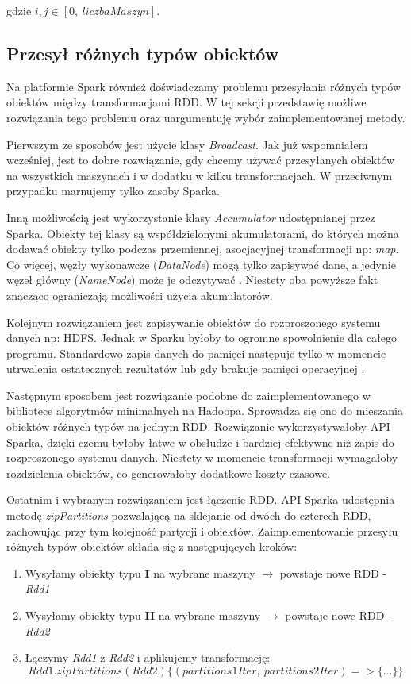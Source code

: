 \documentclass{pracamgr}
\begin{document}
gdzie \(i, j \in [0, \ liczbaMaszyn]\).

\subsection{Przesył różnych typów obiektów}

Na platformie Spark również doświadczamy problemu przesyłania różnych typów obiektów między transformacjami RDD. W tej sekcji przedstawię możliwe rozwiązania tego problemu oraz uargumentuję wybór zaimplementowanej metody.

Pierwszym ze sposobów jest użycie klasy \textit{Broadcast}. Jak już wspomniałem wcześniej, jest to dobre rozwiązanie, gdy chcemy używać przesyłanych obiektów na wszystkich maszynach i w dodatku w kilku transformacjach. W przeciwnym przypadku marnujemy tylko zasoby Sparka.

Inną możliwością jest wykorzystanie klasy \textit{Accumulator} udostępnianej przez Sparka. Obiekty tej klasy są współdzielonymi akumulatorami, do których można dodawać obiekty tylko podczas przemiennej, asocjacyjnej transformacji np: \textit{map}. Co więcej, węzły wykonawcze (\textit{DataNode}) mogą tylko zapisywać dane, a jedynie węzeł główny (\textit{NameNode}) może je odczytywać \cite{spark_documentation}. Niestety oba powyższe fakt znacząco ograniczają możliwości użycia akumulatorów.

Kolejnym rozwiązaniem jest zapisywanie obiektów do rozproszonego systemu danych np: HDFS. Jednak w Sparku byłoby to ogromne spowolnienie dla całego programu. Standardowo zapis danych do pamięci następuje tylko w momencie utrwalenia ostatecznych rezultatów lub gdy brakuje pamięci operacyjnej \cite{zaharia2010spark}.

Następnym sposobem jest rozwiązanie podobne do zaimplementowanego w bibliotece algorytmów minimalnych na Hadoopa. Sprowadza się ono do mieszania obiektów różnych typów na jednym RDD. Rozwiązanie wykorzystywałoby API Sparka, dzięki czemu byłoby łatwe w obsłudze i bardziej efektywne niż zapis do rozproszonego systemu danych. Niestety w momencie transformacji wymagałoby rozdzielenia obiektów, co generowałoby dodatkowe koszty czasowe.

Ostatnim i wybranym rozwiązaniem jest łączenie RDD. API Sparka udostępnia metodę \textit{zipPartitions} pozwalającą na sklejanie od dwóch do czterech RDD, zachowując przy tym kolejność partycji i obiektów. Zaimplementowanie przesyłu różnych typów obiektów składa się z następujących kroków:
\begin{enumerate}
    \item Wysyłamy obiekty typu \textbf{I} na wybrane maszyny $\rightarrow$ powstaje nowe RDD - \textit{Rdd1}
    \item Wysyłamy obiekty typu \textbf{II} na wybrane maszyny $\rightarrow$ powstaje nowe RDD - \textit{Rdd2}
    \item Łączymy \textit{Rdd1} z \textit{Rdd2} i aplikujemy transformację:
    $$Rdd1.zipPartitions(Rdd2)\{(partitions1Iter, \ partitions2Iter) => \{ ... \}\}$$
\end{enumerate}
\end{document}

